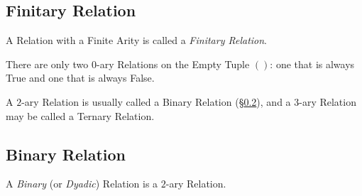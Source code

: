 \subsection{Finitary Relation}\label{sec:finitary_relation}

A Relation with a Finite Arity is called a \emph{Finitary Relation}.

There are only two $0$-ary Relations on the Empty Tuple $()$: one that
is always True and one that is always False.

A $2$-ary Relation is usually called a Binary Relation
(\S\ref{sec:binary_relation}), and a $3$-ary Relation may be called a
Ternary Relation.



\subsection{Binary Relation}\label{sec:binary_relation}

A \emph{Binary} (or \emph{Dyadic}) Relation is a $2$-ary Relation.

